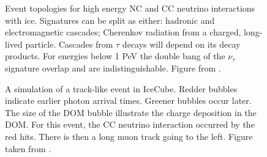 \begin{figure}
    \caption{Event topologies for high energy NC and CC neutrino interactions with ice. Signatures can be split as either: hadronic and electromagnetic cascades; Cherenkov radiation from a charged, long-lived particle. Cascades from $\tau$ decays will depend on its decay products. For energies below 1 PeV the double bang of the $\nu_\tau$ signature overlap and are indistinguishable. Figure from \cite{rene_thesis_nutracks}.}
    \label{fig:event_topology}
\end{figure}

\begin{figure}
    \caption{A simulation of a track-like event in IceCube. Redder bubbles indicate earlier photon arrival times. Greener bubbles occur later. The size of the DOM bubble illustrate the charge deposition in the DOM. For this event, the CC neutrino interaction occurred by the red hits. There is then a long muon track going to the left. Figure taken from \cite{IC3_masterclass}.}
    \label{fig:ic3_track}
\end{figure}

